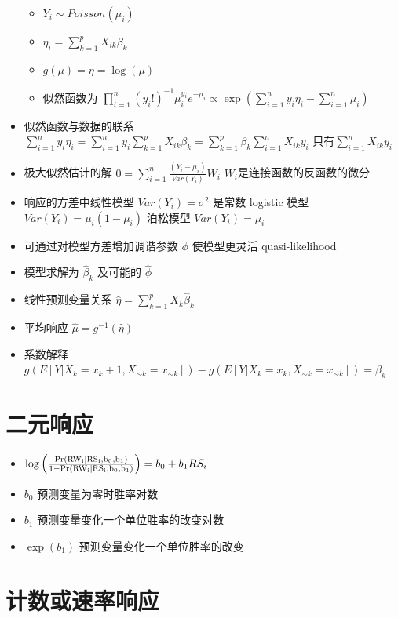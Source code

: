 \documentclass[]{book}
\providecommand{\tightlist}{%
  \setlength{\itemsep}{0pt}\setlength{\parskip}{0pt}}
\begin{document}
\begin{itemize}
  \begin{itemize}
  \tightlist
  \item
    \(Y_i \sim Poisson(\mu_i)\)
  \item
    \(\eta_i = \sum_{k=1}^p X_{ik} \beta_k\)
  \item
    \(g(\mu) = \eta = \log(\mu)\)
  \item
    似然函数为 \(\prod_{i=1}^n (y_i !)^{-1} \mu_i^{y_i}e^{-\mu_i}\propto \exp\left(\sum_{i=1}^n y_i \eta_i - \sum_{i=1}^n \mu_i\right)\)
  \end{itemize}
\item
  似然函数与数据的联系 \(\sum_{i=1}^n y_i \eta_i = \sum_{i=1}^n y_i\sum_{k=1}^p X_{ik} \beta_k = \sum_{k=1}^p \beta_k\sum_{i=1}^n X_{ik} y_i\) 只有\(\sum_{i=1}^n X_{ik} y_i\)
\item
  极大似然估计的解 \(0=\sum_{i=1}^n \frac{(Y_i - \mu_i)}{Var(Y_i)}W_i\) \(W_i\)是连接函数的反函数的微分
\item
  响应的方差中线性模型 \(Var(Y_i) = \sigma^2\) 是常数 logistic 模型 \(Var(Y_i) = \mu_i (1 - \mu_i)\) 泊松模型 \(Var(Y_i) = \mu_i\)
\item
  可通过对模型方差增加调谐参数 \(\phi\) 使模型更灵活 quasi-likelihood
\item
  模型求解为 \(\hat \beta_k\) 及可能的 \(\hat \phi\)
\item
  线性预测变量关系 \(\hat \eta = \sum_{k=1}^p X_k \hat \beta_k\)
\item
  平均响应 \(\hat \mu = g^{-1}(\hat \eta)\)
\item
  系数解释 \(g(E[Y | X_k = x_k + 1, X_{\sim k} = x_{\sim k}]) - g(E[Y | X_k = x_k, X_{\sim k}=x_{\sim k}]) = \beta_k\)
\end{itemize}

\section{二元响应}

\begin{itemize}
\tightlist
\item
  \(\log\left(\frac{\rm{Pr}(RW_i | RS_i, b_0, b_1 )}{1-\rm{Pr}(RW_i | RS_i, b_0, b_1)}\right) = b_0 + b_1 RS_i\)
\item
  \(b_0\) 预测变量为零时胜率对数
\item
  \(b_1\) 预测变量变化一个单位胜率的改变对数
\item
  \(\exp(b_1)\) 预测变量变化一个单位胜率的改变
\end{itemize}

\section{计数或速率响应}
\end{document}
